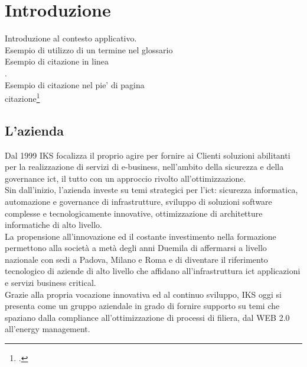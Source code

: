 
\chapter{Introduzione}
\label{cap:introduzione}

Introduzione al contesto applicativo.\\

\noindent Esempio di utilizzo di un termine nel glossario \\

\noindent Esempio di citazione in linea \\
\cite{site:agile-manifesto}. \\

\noindent Esempio di citazione nel pie' di pagina \\
citazione\footcite{womak:lean-thinking} \\

\section{L'azienda}

Dal 1999 IKS focalizza il proprio agire per fornire ai Clienti soluzioni abilitanti per la realizzazione di servizi di e-business, nell’ambito della sicurezza e della \gls{governance} \gls{ict}, il tutto con un approccio rivolto all’ottimizzazione.\\
Sin dall’inizio, l’azienda investe su temi strategici per l’\gls{ict}: sicurezza informatica, automazione e \gls{governance} di infrastrutture, sviluppo di soluzioni software complesse e tecnologicamente innovative, ottimizzazione di architetture informatiche di alto livello.\\
La propensione all’innovazione ed il costante investimento nella formazione permettono alla società a metà degli anni Duemila di affermarsi a livello nazionale con sedi a Padova, Milano e Roma e di diventare il riferimento tecnologico di aziende di alto livello che affidano all’infrastruttura \gls{ict} applicazioni e servizi business critical.\\
Grazie alla propria vocazione innovativa ed al continuo sviluppo, IKS oggi si presenta come un gruppo aziendale in grado di fornire supporto su temi che spaziano dalla \gls{compliance} all’ottimizzazione di processi di filiera, dal WEB 2.0 all’energy management.

